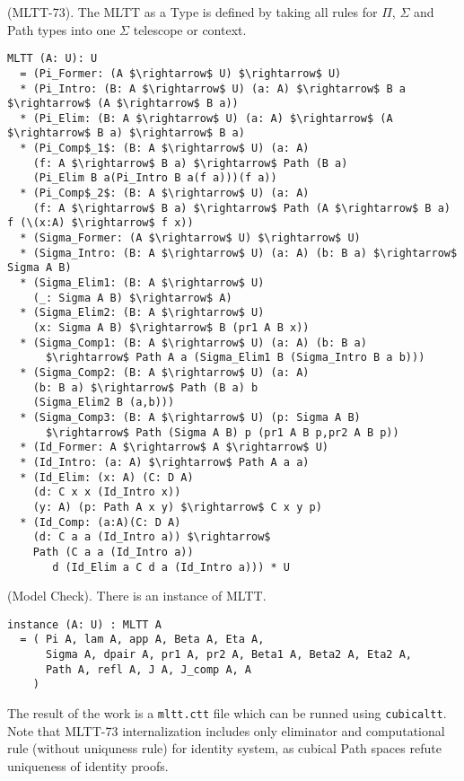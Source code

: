 \documentclass{article}
\begin{document}
\begin{definition} (MLTT-73).
The MLTT as a Type is defined by taking all rules
for $\Pi$, $\Sigma$ and Path types into one $\Sigma$ telescope or context.
\begin{lstlisting}[mathescape=true]
MLTT (A: U): U
  = (Pi_Former: (A $\rightarrow$ U) $\rightarrow$ U)
  * (Pi_Intro: (B: A $\rightarrow$ U) (a: A) $\rightarrow$ B a $\rightarrow$ (A $\rightarrow$ B a))
  * (Pi_Elim: (B: A $\rightarrow$ U) (a: A) $\rightarrow$ (A $\rightarrow$ B a) $\rightarrow$ B a)
  * (Pi_Comp$_1$: (B: A $\rightarrow$ U) (a: A)
    (f: A $\rightarrow$ B a) $\rightarrow$ Path (B a)
    (Pi_Elim B a(Pi_Intro B a(f a)))(f a))
  * (Pi_Comp$_2$: (B: A $\rightarrow$ U) (a: A)
    (f: A $\rightarrow$ B a) $\rightarrow$ Path (A $\rightarrow$ B a) f (\(x:A) $\rightarrow$ f x))
  * (Sigma_Former: (A $\rightarrow$ U) $\rightarrow$ U)
  * (Sigma_Intro: (B: A $\rightarrow$ U) (a: A) (b: B a) $\rightarrow$ Sigma A B)
  * (Sigma_Elim1: (B: A $\rightarrow$ U)
    (_: Sigma A B) $\rightarrow$ A)
  * (Sigma_Elim2: (B: A $\rightarrow$ U)
    (x: Sigma A B) $\rightarrow$ B (pr1 A B x))
  * (Sigma_Comp1: (B: A $\rightarrow$ U) (a: A) (b: B a) 
      $\rightarrow$ Path A a (Sigma_Elim1 B (Sigma_Intro B a b)))
  * (Sigma_Comp2: (B: A $\rightarrow$ U) (a: A)
    (b: B a) $\rightarrow$ Path (B a) b
    (Sigma_Elim2 B (a,b)))
  * (Sigma_Comp3: (B: A $\rightarrow$ U) (p: Sigma A B)
      $\rightarrow$ Path (Sigma A B) p (pr1 A B p,pr2 A B p))
  * (Id_Former: A $\rightarrow$ A $\rightarrow$ U)
  * (Id_Intro: (a: A) $\rightarrow$ Path A a a)
  * (Id_Elim: (x: A) (C: D A)
    (d: C x x (Id_Intro x))
    (y: A) (p: Path A x y) $\rightarrow$ C x y p)
  * (Id_Comp: (a:A)(C: D A)
    (d: C a a (Id_Intro a)) $\rightarrow$
    Path (C a a (Id_Intro a))
       d (Id_Elim a C d a (Id_Intro a))) * U
\end{lstlisting}
\end{definition}

\begin{theorem} (Model Check).
There is an instance of MLTT.
\begin{lstlisting}
instance (A: U) : MLTT A
  = ( Pi A, lam A, app A, Beta A, Eta A,
      Sigma A, dpair A, pr1 A, pr2 A, Beta1 A, Beta2 A, Eta2 A,
      Path A, refl A, J A, J_comp A, A
    )
\end{lstlisting}
\end{theorem}

The result of the work is a \texttt{mltt.ctt} file which can be runned using \texttt{cubicaltt}.
Note that MLTT-73 internalization includes only eliminator and computational rule (without uniquness rule)
for identity system, as cubical Path spaces refute uniqueness of identity proofs.
\end{document}

